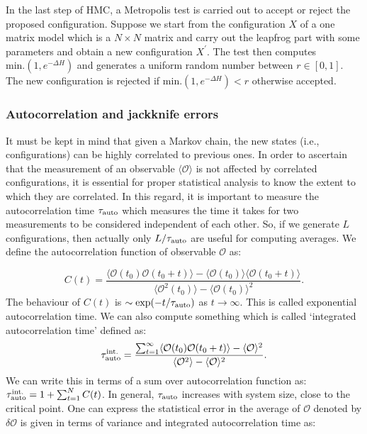 \documentclass[11pt]{article}
\begin{document}
In the last step of HMC, a Metropolis test is carried out to accept or reject the proposed
configuration. Suppose we start from the configuration $X$ of a one matrix model 
which is a $N \times N$ matrix and carry out the leapfrog part with some parameters and obtain a new configuration 
$X^{\prime}$. The test then computes \texttt{$\text{min.}(1, e^{-\Delta H})$} and generates 
a uniform random number between $r \in [0,1]$. The new configuration is 
rejected if \texttt{$\text{min.}(1, e^{-\Delta H}) < r$} otherwise accepted. 


\subsubsection{Autocorrelation and jackknife errors} 
It must be kept in mind that given a Markov chain, the new states 
(i.e., configurations) can be highly correlated to previous ones. 
In order to ascertain that the measurement of an observable $\langle \mathcal{O} \rangle$ is not affected by correlated configurations, it is essential for proper statistical analysis to know the extent to which they are correlated. In this regard, it is important to measure
the autocorrelation time $ \tau_{\rm{auto}}$ which measures the time it takes for two measurements to be considered independent of each other. So, if we generate $L$ configurations, then actually only $L/\tau_{\rm{auto}}$ are useful for computing averages.
We define the autocorrelation function of observable $\mathcal{O}$ as:
 
 \begin{equation}
 	C(t) = \frac{\langle \mathcal{O}(t_0) \mathcal{O}(t_0 + t) \rangle - \langle \mathcal{O}(t_0)\rangle \langle \mathcal{O}(t_0 + t) \rangle}{\langle \mathcal{O}^2(t_0)\rangle - \langle \mathcal{O}(t_0)\rangle^{2}}.
 \end{equation}
The behaviour of $C(t)$ is $\sim \exp(-t/\tau_{\rm{auto}})$ as $ t \to \infty$. This is called exponential autocorrelation time. We can also compute something which is called `integrated autocorrelation time' defined as:
\begin{equation}
	\tau_{\rm{auto}}^{\rm{int.}} = \frac{\sum_{t=1}^{\infty} \langle \mathcal{O}(t_0) \mathcal{O}(t_0 + t) \rangle - \langle \mathcal{O} \rangle^2 }{\langle \mathcal{O}^2\rangle - \langle \mathcal{O}\rangle^{2}}.
\end{equation}
We can write this in terms of a sum over autocorrelation function as: $\tau_{\rm{auto}}^{\rm{int.}} = 1 + \sum_{t=1}^{N} C(t)$. In general, $ \tau_{\rm{auto}}$ increases with system size, close to the critical point. One 
can express the statistical error in the average of $\mathcal{O}$ denoted 
by $\delta \mathcal{O}$ is given in terms of variance and integrated autocorrelation time as:
\end{document}
